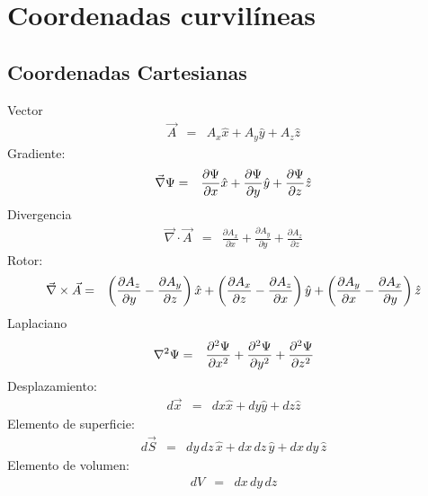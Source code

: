 \chapter{Coordenadas curvilíneas}

\section{Coordenadas Cartesianas}
\noindent Vector
\begin{eqnarray}
\vec{A}
&=& A_x{\hat x} + A_y {\hat y} + A_z {\hat z}
\end{eqnarray}
Gradiente:
\begin{eqnarray}
 \vec\nabla\Psi&=&{\partial\Psi\over \partial x} {\hat x} + {\partial\Psi\over
\partial y} {\hat y}   + {\partial\Psi\over \partial z} {\hat z}
\end{eqnarray}
Divergencia
\begin{eqnarray}
 \vec\nabla \cdot \vec{A}
&=& \frac{\partial  A_x}{\partial x}+\frac{\partial  A_y}{\partial y}+\frac{\partial  A_z}{\partial z}
\end{eqnarray}
Rotor:
\begin{eqnarray}
\vec\nabla \times  \vec{A}
&=&   \left({\partial A_z \over \partial y} - {\partial A_y \over
\partial z}\right)  {\hat x}  +
   \left({\partial A_x \over \partial z} - {\partial A_z \over
\partial x}\right)  {\hat y}  +
   \left({\partial A_y \over \partial x} - {\partial A_x \over
\partial y}\right)  {\hat z}
\end{eqnarray}
Laplaciano
\begin{eqnarray}
 \nabla^2 \Psi
&=& {\partial^2\Psi\over \partial x^2} + {\partial^2\Psi\over \partial y^2} +
{\partial^2\Psi\over \partial z^2}
\end{eqnarray}
Desplazamiento:
\begin{eqnarray}
 d \vec{x} &=& dx {\hat x} + dy {\hat y} + dz {\hat z}
\end{eqnarray}
Elemento de superficie:
\begin{eqnarray}
 d \vec{S} &=& dy\,dz\, {\hat x} + dx\,dz\, {\hat y} +
dx\,dy\, {\hat z}
\end{eqnarray}
Elemento de volumen:
\begin{eqnarray}
 dV &=& dx\,dy\,dz
\end{eqnarray}

